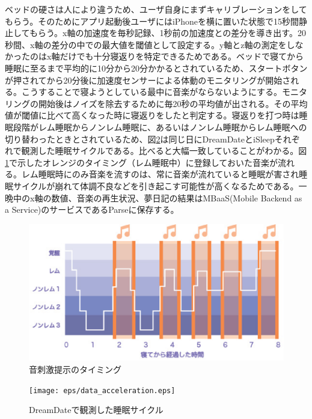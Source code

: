 ベッドの硬さは人により違うため、ユーザ自身にまずキャリブレーションをしてもらう。そのためにアプリ起動後ユーザにはiPhoneを横に置いた状態で15秒間静止してもらう。x軸の加速度を毎秒記録、1秒前の加速度との差分を導き出す。20秒間、x軸の差分の中での最大値を閾値として設定する。y軸とz軸の測定をしなかったのはx軸だけでも十分寝返りを特定できるためである。ベッドで寝てから睡眠に至るまで平均的に10分から20分かかるとされているため、スタートボタンが押されてから20分後に加速度センサーによる体動のモニタリングが開始される。こうすることで寝ようとしている最中に音楽がならないようにする。モニタリングの開始後はノイズを除去するために毎20秒の平均値が出される。その平均値が閾値に比べて高くなった時に寝返りをしたと判定する。寝返りを打つ時は睡眠段階がレム睡眠からノンレム睡眠に、あるいはノンレム睡眠からレム睡眠への切り替わったときとされているため\cite{negaeri}、図\ref{data_acceleration}は同じ日にDreamDateとiSleepそれぞれで観測した睡眠サイクルである。比べると大幅一致していることがわかる。図\ref{melodyGraph}で示したオレンジのタイミング（レム睡眠中）に登録しておいた音楽が流れる。レム睡眠時にのみ音楽を流すのは、常に音楽が流れていると睡眠が害され睡眠サイクルが崩れて体調不良などを引き起こす可能性が高くなるためである。一晩中のx軸の数値、音楽の再生状況、夢日記の結果はMBaaS(Mobile Backend as a Service)のサービスであるParseに保存する\cite{parse}。

\begin{figure}[htbp]
\begin{center}
\includegraphics[width=13cm]{eps/remNonrem.eps}
\caption{音刺激提示のタイミング}
\label{melodyGraph}
\end{center}
\end{figure}

\begin{figure}[htbp]
\begin{center}
\texttt{[image: eps/data\_acceleration.eps]}
\caption{DreamDateで観測した睡眠サイクル }
\label{data_acceleration}
\end{center}
\end{figure}

